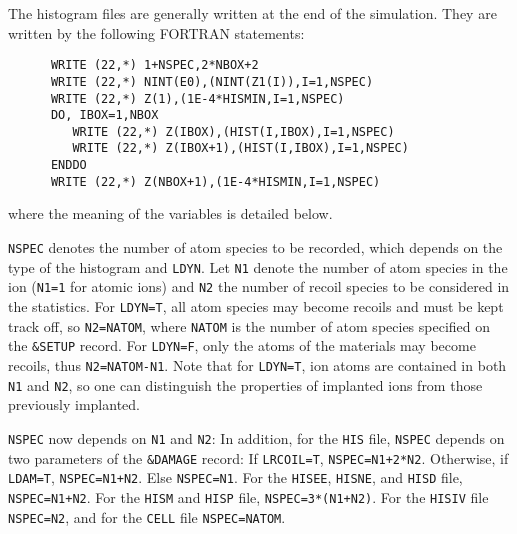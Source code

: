 \bigskip

The histogram files are generally written at the end of the simulation. They are
written by the following FORTRAN statements:
%
\begin{verbatim}
      WRITE (22,*) 1+NSPEC,2*NBOX+2
      WRITE (22,*) NINT(E0),(NINT(Z1(I)),I=1,NSPEC)
      WRITE (22,*) Z(1),(1E-4*HISMIN,I=1,NSPEC)
      DO, IBOX=1,NBOX
         WRITE (22,*) Z(IBOX),(HIST(I,IBOX),I=1,NSPEC)
         WRITE (22,*) Z(IBOX+1),(HIST(I,IBOX),I=1,NSPEC)
      ENDDO
      WRITE (22,*) Z(NBOX+1),(1E-4*HISMIN,I=1,NSPEC)
\end{verbatim}
%
where the meaning of the variables is detailed below.

\texttt{NSPEC} denotes the number of atom species to be recorded, which depends
on the type of the histogram and \texttt{LDYN}. Let \texttt{N1} denote the
number of atom species in the ion (\texttt{N1=1} for atomic ions) and
\texttt{N2} the number of recoil species to be considered in the statistics. For
\texttt{LDYN=T}, all atom species may become recoils and must be kept track off,
so \texttt{N2=NATOM}, where \texttt{NATOM} is the number of atom species
specified on the \texttt{\&SETUP} record. For \texttt{LDYN=F}, only the atoms of
the materials may become recoils, thus \texttt{N2=NATOM-N1}. Note that for
\texttt{LDYN=T}, ion atoms are contained in both \texttt{N1} and \texttt{N2}, so
one can distinguish the properties of implanted ions from those previously
implanted. 

\texttt{NSPEC} now depends on \texttt{N1} and \texttt{N2}: In addition, for the
\texttt{HIS} file, \texttt{NSPEC} depends on two parameters of the
\texttt{\&DAMAGE} record: If \texttt{LRCOIL=T}, \texttt{NSPEC=N1+2*N2}.
Otherwise, if \texttt{LDAM=T}, \texttt{NSPEC=N1+N2}. Else \texttt{NSPEC=N1}. For
the \texttt{HISEE}, \texttt{HISNE}, and \texttt{HISD} file,
\texttt{NSPEC=N1+N2}. For the \texttt{HISM} and \texttt{HISP} file,
\texttt{NSPEC=3*(N1+N2)}. For the \texttt{HISIV} file \texttt{NSPEC=N2}, and for
the \texttt{CELL} file \texttt{NSPEC=NATOM}.

